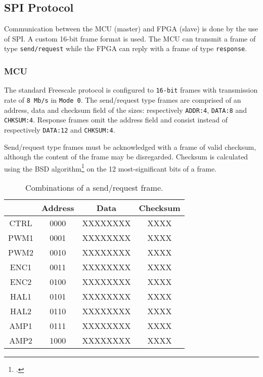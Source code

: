 \subsection{SPI Protocol}
Communication between the MCU (master) and FPGA (slave) is done by the use of SPI. A custom 16-bit frame format is used. The MCU can transmit a frame of type \texttt{send/request} while the FPGA can reply with a frame of type \texttt{response}.\medskip

\subsubsection{MCU}
The standard Freescale protocol is configured to \texttt{16-bit} frames with transmission rate of \texttt{8 Mb/s} in \texttt{Mode 0}. The send/request type frames are comprised of an address, data and checksum field of the sizes: respectively \texttt{ADDR:4}, \texttt{DATA:8} and \texttt{CHKSUM:4}. Response frames omit the address field and consist instead of respectively \texttt{DATA:12} and \texttt{CHKSUM:4}.\medskip

Send/request type frames must be acknowledged with a frame of valid checksum, although the content of the frame may be disregarded. Checksum is calculated using the BSD algorithm\footcite[]{bsd_wiki} on the 12 most-significant bits of a frame.\medskip

\begin{table}[h!]
\centering
\begin{tabular}{|c|c|c|c|}
\hline
\multicolumn{1}{|l|}{} & Address & Data     & Checksum \\ \hline
CTRL                   & 0000    & XXXXXXXX & XXXX     \\ \hline
PWM1                   & 0001    & XXXXXXXX & XXXX     \\ \hline
PWM2                   & 0010    & XXXXXXXX & XXXX     \\ \hline
ENC1                   & 0011    & XXXXXXXX & XXXX     \\ \hline
ENC2                   & 0100    & XXXXXXXX & XXXX     \\ \hline
HAL1                   & 0101    & XXXXXXXX & XXXX     \\ \hline
HAL2                   & 0110    & XXXXXXXX & XXXX     \\ \hline
AMP1                   & 0111    & XXXXXXXX & XXXX     \\ \hline
AMP2                   & 1000    & XXXXXXXX & XXXX     \\ \hline
\end{tabular}
\caption{Combinations of a send/request frame.}
\label{tab: spi_1}
\end{table}

